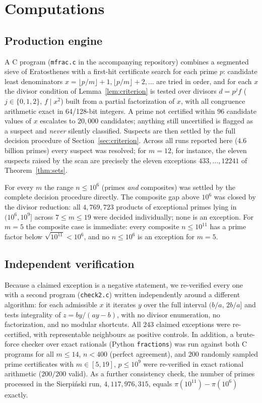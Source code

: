 \documentclass[11pt]{amsart}
\theoremstyle{remark}
\theoremstyle{definition}
\begin{document}
\section{Computations}\label{sec:computations}

\subsection{Production engine}
A C program (\texttt{mfrac.c} in the accompanying repository) combines a
segmented sieve of Eratosthenes with a first-hit certificate search for
each prime $p$: candidate least denominators
$x = \lfloor p/m \rfloor + 1, \lfloor p/m \rfloor + 2, \dots$ are tried
in order, and for each $x$ the divisor condition of
Lemma~\ref{lem:criterion} is tested over divisors $d = p^{j} f$
($j \in \{0,1,2\}$, $f \mid x^2$) built from a partial factorization of
$x$, with all congruence arithmetic exact in 64/128-bit integers. A prime
not certified within $96$ candidate values of $x$ escalates to $20{,}000$
candidates; anything still uncertified is flagged as a suspect and
\emph{never} silently classified. Suspects are then settled by the full
decision procedure of Section~\ref{sec:criterion}. Across all runs
reported here ($4.6$ billion primes) every suspect was resolved; for
$m = 12$, for instance, the eleven suspects raised by the scan are
precisely the eleven exceptions $433, \dots, 12241$ of
Theorem~\ref{thm:sets}.

For every $m$ the range $n \le 10^6$ (primes \emph{and} composites) was
settled by the complete decision procedure directly. The composite gap
above $10^6$ was closed by the divisor reduction: all
$4{,}769{,}723$ products of exceptional primes lying in $(10^6, 10^9]$
across $7 \le m \le 19$ were decided individually; none is an exception.
For $m = 5$ the composite case is immediate: every composite
$n \le 10^{11}$ has a prime factor below $\sqrt{10^{11}} < 10^6$, and no
$n \le 10^6$ is an exception for $m=5$.

\subsection{Independent verification}
Because a claimed exception is a negative statement, we re-verified every
one with a second program (\texttt{check2.c}) written independently around
a different algorithm: for each admissible $x$ it iterates $y$ over the
full interval $(b/a,\, 2b/a]$ and tests integrality of
$z = by/(ay - b)$, with no divisor enumeration, no factorization, and no
modular shortcuts. All $243$ claimed exceptions were re-certified, with
representable neighbours as positive controls. In addition, a brute-force
checker over exact rationals (Python \texttt{fractions}) was run against
both C programs for all $m \le 14$, $n < 400$ (perfect agreement), and
$200$ randomly sampled prime certificates with $m \in [5,19]$,
$p \le 10^9$ were re-verified in exact rational arithmetic ($200/200$
valid). As a further consistency check, the number of primes processed in
the Sierpi\'nski run, $4{,}117{,}976{,}315$, equals
$\pi(10^{11}) - \pi(10^6)$ exactly.
\end{document}
